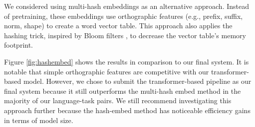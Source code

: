 \documentclass[11pt]{article}
\begin{document}
We considered using multi-hash embeddings \cite{miranda-etal-2022-multi} as an alternative approach.
Instead of pretraining, these embeddings use orthographic features (e.g., prefix, suffix, norm, shape) to create a word vector table.
This approach also applies the hashing trick, inspired by Bloom filters \cite{bloom-1970-space}, to decrease the vector table's memory footprint.

Figure \ref{fig:hashembed} shows the results in comparison to our final system.
It is notable that simple orthographic features are competitive with our transformer-based model.
However, we chose to submit the transformer-based pipeline as our final system because it still outperforms the multi-hash embed method in the majority of our language-task pairs. 
We still recommend investigating this approach further because the hash-embed method has noticeable efficiency gains in terms of model size.
\end{document}
